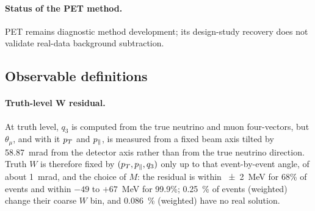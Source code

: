 \paragraph{Status of the PET method.} PET remains diagnostic method development; its design-study recovery does not validate real-data background subtraction.

\subsection{Observable definitions}\label{recsec:method-observables}

\paragraph{Truth-level W residual.} At truth level, $q_{3}$ is computed from the true neutrino and muon four-vectors, but $\theta_{\mu}$, and with it $p_{T}$ and $p_{\parallel}$, is measured from a fixed beam axis tilted by \SI{58.87}{mrad} from the detector axis rather than from the true neutrino direction.  Truth $W$ is therefore fixed by $(p_{T},p_{\parallel},q_{3})$ only up to that event-by-event angle, of about \SI{1}{mrad}, and the choice of $M$: the residual is within \SI{\pm2}{MeV} for 68\% of events and within $-49$ to $+67$~MeV for 99.9\%; \SI{0.25}{\percent} of events (weighted) change their coarse $W$ bin, and \SI{0.086}{\percent} (weighted) have no real solution. 

